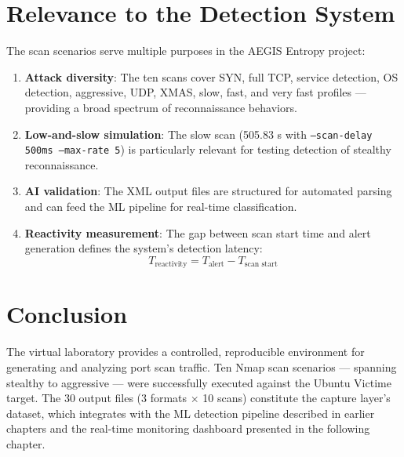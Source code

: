 \section{Relevance to the Detection System}

The scan scenarios serve multiple purposes in the AEGIS Entropy project:

\begin{enumerate}
    \item \textbf{Attack diversity}: The ten scans cover SYN, full TCP, service detection, OS detection, aggressive, UDP, XMAS, slow, fast, and very fast profiles --- providing a broad spectrum of reconnaissance behaviors.
    \item \textbf{Low-and-slow simulation}: The slow scan (505.83 s with \texttt{--scan-delay 500ms --max-rate 5}) is particularly relevant for testing detection of stealthy reconnaissance.
    \item \textbf{AI validation}: The XML output files are structured for automated parsing and can feed the ML pipeline for real-time classification.
    \item \textbf{Reactivity measurement}: The gap between scan start time and alert generation defines the system's detection latency:
    \[
    T_{\text{reactivity}} = T_{\text{alert}} - T_{\text{scan start}}
    \]
\end{enumerate}

\section{Conclusion}

The virtual laboratory provides a controlled, reproducible environment for generating and analyzing port scan traffic. Ten Nmap scan scenarios --- spanning stealthy to aggressive --- were successfully executed against the Ubuntu Victime target. The 30 output files (3 formats $\times$ 10 scans) constitute the capture layer's dataset, which integrates with the ML detection pipeline described in earlier chapters and the real-time monitoring dashboard presented in the following chapter.
